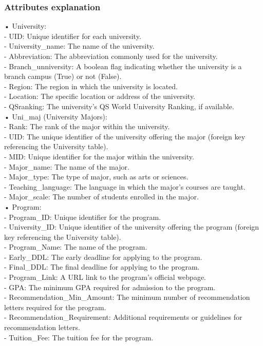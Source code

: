 \documentclass[12pt, a4paper]{article}
\begin{document}
\begin{spacing}{1.32}
\subsubsection{Attributes explanation}
\noindent
• University:\\
    - UID: Unique identifier for each university.\\
    - University\_name: The name of the university.\\
    - Abbreviation: The abbreviation commonly used for the university.\\
    - Branch\_unniversity: A boolean flag indicating whether the university is a branch campus (True) or not (False).\\
    - Region: The region in which the university is located.\\
    - Location: The specific location or address of the university.\\
    - QSranking: The university's QS World University Ranking, if available.\\
    
\noindent
• Uni\_maj (University Majors):\\
- Rank: The rank of the major within the university.\\
- UID: The unique identifier of the university offering the major (foreign key referencing the University table).\\
- MID: Unique identifier for the major within the university.\\
- Major\_name: The name of the major.\\
- Major\_type: The type of major, such as arts or sciences.\\
- Teaching\_language: The language in which the major's courses are taught.\\
- Major\_scale: The number of students enrolled in the major.\\

\noindent
• Program:\\
- Program\_ID: Unique identifier for the program.\\
- University\_ID: Unique identifier of the university offering the program (foreign key referencing the University table).\\
- Program\_Name: The name of the program.\\
- Early\_DDL: The early deadline for applying to the program.\\
- Final\_DDL: The final deadline for applying to the program.\\
- Program\_Link: A URL link to the program's official webpage.\\
- GPA: The minimum GPA required for admission to the program.\\
- Recommendation\_Min\_Amount: The minimum number of recommendation letters required for the program.\\
- Recommendation\_Requirement: Additional requirements or guidelines for recommendation letters.\\
- Tuition\_Fee: The tuition fee for the program.\\


\end{spacing}
\end{document}

